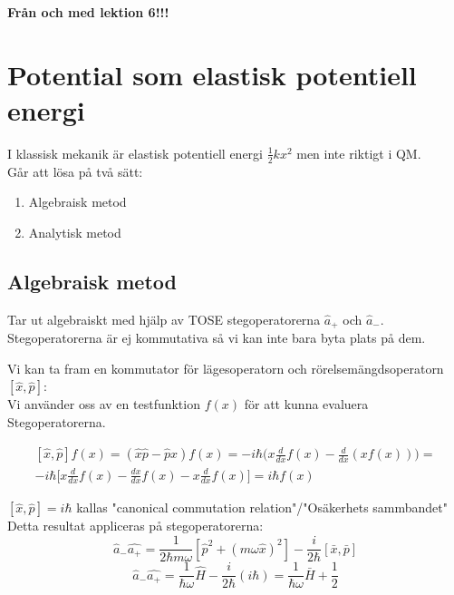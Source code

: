 \documentclass{article}
\begin{document}
  \textbf{Från och med lektion 6!!!}
  \section{Potential som elastisk potentiell energi}
  I klassisk mekanik är elastisk potentiell energi $\frac{1}{2}kx^2$ men inte riktigt i QM.\\

  Går att lösa på två sätt:
  \begin{enumerate}
    \item Algebraisk metod
    \item Analytisk metod
  \end{enumerate}

  \subsection{Algebraisk metod}
  Tar ut algebraiskt med hjälp av TOSE stegoperatorerna $\hat{a}_+$ och $\hat{a}_-$. Stegoperatorerna är ej kommutativa så vi kan inte bara byta plats på dem.

  Vi kan ta fram en kommutator för lägesoperatorn och rörelsemängdsoperatorn $[\hat{x},\hat{p}]$:\\
  Vi använder oss av en testfunktion $f(x)$ för att kunna evaluera Stegoperatorerna.

  \begin{equation}
    \begin{split}
      [\hat{x},\hat{p}]f(x)=(\hat{x}\hat{p}-\hat{p}\hat{x})f(x)=-i\hbar\bigg(x\frac{d}{dx}f(x)-\frac{d}{dx}(xf(x))\bigg)=\\
      -i\hbar\bigg[x\frac{d}{dx}f(x)-\frac{dx}{dx}f(x)-x\frac{d}{dx}f(x)\bigg]=i\hbar f(x)
    \end{split}
  \end{equation}

  $[\hat{x},\hat{p}]=i\hbar$ kallas "canonical commutation relation"/"Osäkerhets sammbandet"\\

  Detta resultat appliceras på stegoperatorerna:
  \begin{equation}
    \hat{a}_-\hat{a_+}=\frac{1}{2\hbar m \omega}[\hat{p}^2+(m\omega\hat{x})^2]-\frac{i}{2\hbar}[\bar{x},\bar{p}]
  \end{equation}
\begin{equation}
  \hat{a}_-\hat{a_+}=\frac{1}{\hbar\omega}\hat{H}-\frac{i}{2\hbar}(i\hbar)=\frac{1}{\hbar\omega}\bar{H}+\frac{1}{2}
\end{equation}
\end{document}
